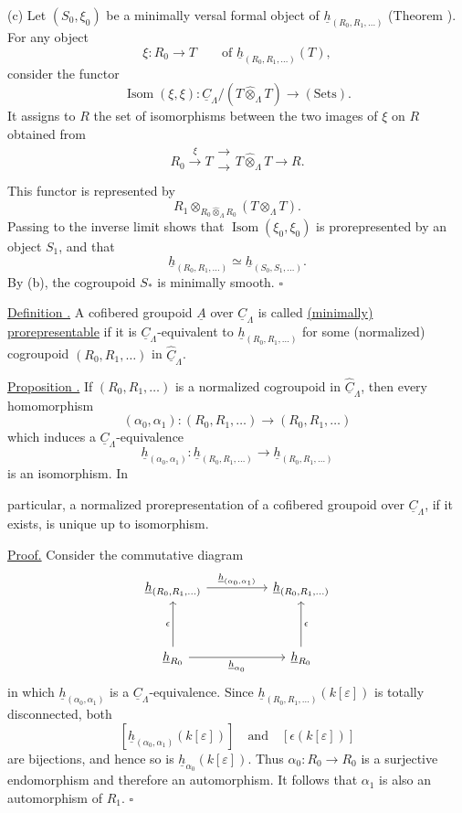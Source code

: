(c) Let $(S_0,\xi_0)$ be a minimally versal formal object of
$\underline h_{(R_0,R_1,\ldots)}$ (Theorem ). For any object
\[
 \xi:R_0\longrightarrow T
 \qquad\text{of }\underline h_{(R_0,R_1,\ldots)}(T),
\]
consider the functor
\[
 \operatorname{Isom}(\xi,\xi):
 \underline C_\Lambda/(T\widehat\otimes_\Lambda T)
 \longrightarrow(\mathrm{Sets}).
\]
It assigns to $R$ the set of isomorphisms between the two images of
$\xi$ on $R$ obtained from
\[
 R_0\xrightarrow{\ \xi\ }T
 \mathrel{\substack{\xrightarrow{}\\[-.6ex]\xrightarrow[]{}}}
 T\widehat\otimes_\Lambda T\longrightarrow R.
\]
This functor is represented by
\[
 R_1\otimes_{R_0\widehat\otimes_\Lambda R_0}
       (T\otimes_\Lambda T).
\]
Passing to the inverse limit shows that
$\operatorname{Isom}(\xi_0,\xi_0)$ is prorepresented by an object
$S_1$, and that
\[
 \underline h_{(R_0,R_1,\ldots)}
 \simeq\underline h_{(S_0,S_1,\ldots)}.
\]
By (b), the cogroupoid $S_*$ is minimally smooth. \hfill$\square$

\underline{Definition .} A cofibered groupoid $\underline A$
over $\underline C_\Lambda$ is called \underline{(minimally)
prorepresentable} if it is $\underline C_\Lambda$-equivalent to
$\underline h_{(R_0,R_1,\ldots)}$ for some (normalized) cogroupoid
$(R_0,R_1,\ldots)$ in $\widehat{\underline C}_\Lambda$.

\underline{Proposition .} If $(R_0,R_1,\ldots)$ is a normalized
cogroupoid in $\widehat{\underline C}_\Lambda$, then every
homomorphism
\[
 (\alpha_0,\alpha_1):(R_0,R_1,\ldots)
 \longrightarrow(R_0,R_1,\ldots)
\]
which induces a $\underline C_\Lambda$-equivalence
\[
 \underline h_{(\alpha_0,\alpha_1)}:
 \underline h_{(R_0,R_1,\ldots)}
 \longrightarrow\underline h_{(R_0,R_1,\ldots)}
\]
is an isomorphism. In


particular, a normalized prorepresentation of a cofibered groupoid
over $\underline C_\Lambda$, if it exists, is unique up to
isomorphism.

\underline{Proof.} Consider the commutative diagram
\[
\begin{tikzcd}[column sep=huge,row sep=huge]
 \underline h_{(R_0,R_1,\ldots)}
   \arrow[r,"{\underline h_{(\alpha_0,\alpha_1)}}"]
 & \underline h_{(R_0,R_1,\ldots)}\\
 \underline h_{R_0} \arrow[u,"\epsilon"]
   \arrow[r,"{\underline h_{\alpha_0}}"']
 & \underline h_{R_0} \arrow[u,"\epsilon"']
\end{tikzcd}
\]
in which $\underline h_{(\alpha_0,\alpha_1)}$ is a
$\underline C_\Lambda$-equivalence. Since
$\underline h_{(R_0,R_1,\ldots)}(k[\varepsilon])$ is totally
disconnected, both
\[
 [\underline h_{(\alpha_0,\alpha_1)}(k[\varepsilon])]
 \quad\text{and}\quad
 [\epsilon(k[\varepsilon])]
\]
are bijections, and hence so is
$\underline h_{\alpha_0}(k[\varepsilon])$. Thus
$\alpha_0:R_0\longrightarrow R_0$ is a surjective endomorphism and
therefore an automorphism. It follows that $\alpha_1$ is also an
automorphism of $R_1$. \hfill$\square$
